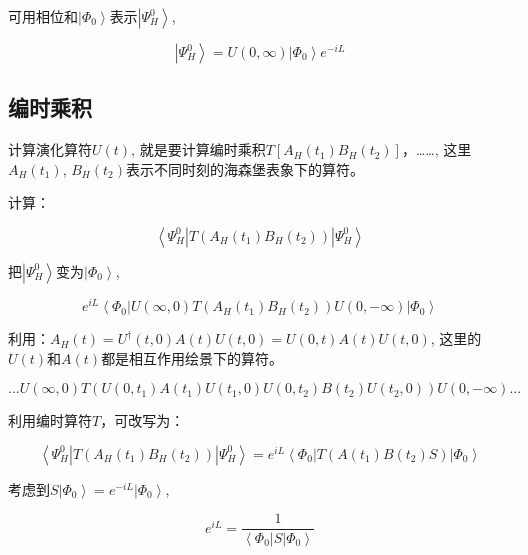 可用相位和$\left| \Phi_0 \right\rangle$表示$\left| \Psi_H^0 \right\rangle$,

\begin{equation}
\left| \Psi_H^0 \right\rangle = U(0, \infty) \left| \Phi_0 \right\rangle e^{-iL} 
\end{equation}

\subsection{编时乘积}

计算演化算符$U(t)$, 就是要计算编时乘积$T [ A_H(t_1) B_H(t_2) ] $，……, 这里$A_H(t_1)$, $B_H(t_2)$表示不同时刻的海森堡表象下的算符。

计算：

\begin{equation}
\left\langle \Psi_H^0 \right| T \left( A_H(t_1) B_H(t_2)  \right) \left|  \Psi_H^0 \right\rangle
\end{equation}

把$\left|  \Psi_H^0 \right\rangle$变为$\left|  \Phi_0 \right\rangle$,

\begin{equation*}
e^{iL} \left\langle \Phi_0 \right|  U(\infty, 0) T \left( A_H(t_1) B_H(t_2)  \right) U (0, -\infty) \left| \Phi_0 \right\rangle 
\end{equation*}

利用：$A_H (t) = U^\dagger (t,0) A(t) U(t,0) = U(0,t) A(t) U(t,0)$, 这里的$U(t)$和$A(t)$都是相互作用绘景下的算符。

\begin{equation*}
... U(\infty, 0) T \left( U(0, t_1) A(t_1) U(t_1,0) U(0,t_2) B(t_2) U(t_2,0)  \right) U(0,-\infty)  ...
\end{equation*}

利用编时算符$T$，可改写为：

\begin{equation}
\left\langle \Psi_H^0 \right| T \left( A_H(t_1)B_H(t_2)  \right) \left| \Psi_H^0 \right\rangle = e^{iL} \left\langle \Phi_0 \right|  T \left( A(t_1)  B(t_2) S  \right) \left| \Phi_0 \right\rangle
\end{equation}

考虑到$S \left| \Phi_0 \right\rangle = e^{-iL} \left| \Phi_0 \right\rangle$,

\begin{equation*}
 e^{iL} = \frac{1}{ \left\langle \Phi_0 \right| S \left| \Phi_0 \right\rangle }
\end{equation*}

